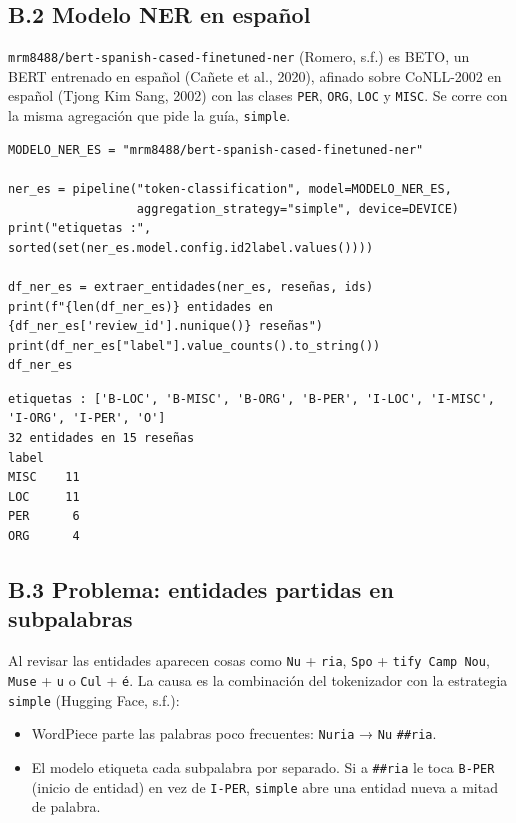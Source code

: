 \documentclass[12pt,a4paper]{article}
\begin{document}
\subsection{B.2 Modelo NER en español}

\nolinkurl{mrm8488/bert-spanish-cased-finetuned-ner} (Romero, s.f.) es BETO, un BERT
entrenado en español (Cañete et al., 2020), afinado sobre CoNLL-2002 en español (Tjong Kim Sang,
2002) con las clases \texttt{PER}, \texttt{ORG}, \texttt{LOC} y \texttt{MISC}. Se corre con la
misma agregación que pide la guía, \texttt{simple}.

\begin{lstlisting}[style=codigo]
MODELO_NER_ES = "mrm8488/bert-spanish-cased-finetuned-ner"

ner_es = pipeline("token-classification", model=MODELO_NER_ES,
                  aggregation_strategy="simple", device=DEVICE)
print("etiquetas :", sorted(set(ner_es.model.config.id2label.values())))

df_ner_es = extraer_entidades(ner_es, reseñas, ids)
print(f"{len(df_ner_es)} entidades en {df_ner_es['review_id'].nunique()} reseñas")
print(df_ner_es["label"].value_counts().to_string())
df_ner_es
\end{lstlisting}

\begin{lstlisting}[style=salida]
etiquetas : ['B-LOC', 'B-MISC', 'B-ORG', 'B-PER', 'I-LOC', 'I-MISC', 'I-ORG', 'I-PER', 'O']
32 entidades en 15 reseñas
label
MISC    11
LOC     11
PER      6
ORG      4
\end{lstlisting}


\subsection{B.3 Problema: entidades partidas en subpalabras}

Al revisar las entidades aparecen cosas como \texttt{Nu} + \texttt{ria},
\texttt{Spo} + \texttt{tify Camp Nou}, \texttt{Muse} + \texttt{u} o \texttt{Cul} + \texttt{é}. La
causa es la combinación del tokenizador con la estrategia \texttt{simple} (Hugging Face, s.f.):

\begin{itemize}[leftmargin=1.2em]
\item WordPiece parte las palabras poco frecuentes: \texttt{Nuria} → \texttt{Nu} \texttt{\#\#ria}.
\item El modelo etiqueta cada subpalabra por separado. Si a \texttt{\#\#ria} le toca
\texttt{B-PER} (inicio de entidad) en vez de \texttt{I-PER}, \texttt{simple} abre una entidad nueva
a mitad de palabra.
\end{itemize}
\end{document}
